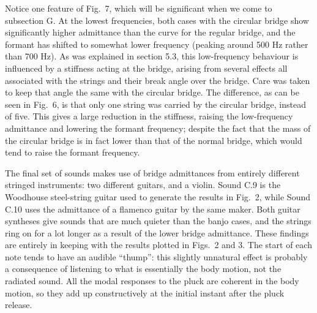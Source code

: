 
  Notice one feature of Fig.\ 7, which will be significant when we come to 
  subsection G. At the lowest frequencies, both cases with the circular bridge 
  show significantly higher admittance than the curve for the regular bridge, 
  and the formant has shifted to somewhat lower frequency (peaking around 500 
  Hz rather than 700 Hz). As was explained in section 5.3, this low-frequency 
  behaviour is influenced by a stiffness acting at the bridge, arising from 
  several effects all associated with the strings and their break angle over 
  the bridge. Care was taken to keep that angle the same with the circular 
  bridge. The difference, as can be seen in Fig.\ 6, is that only one string 
  was carried by the circular bridge, instead of five. This gives a large 
  reduction in the stiffness, raising the low-frequency admittance and lowering 
  the formant frequency; despite the fact that the mass of the circular bridge 
  is in fact lower than that of the normal bridge, which would tend to raise 
  the formant frequency. 

  The final set of sounds makes use of bridge admittances from entirely 
  different stringed instruments: two different guitars, and a violin. Sound 
  C.9 is the Woodhouse steel-string guitar used to generate the results in 
  Fig.\ 2, while Sound C.10 uses the admittance of a flamenco guitar by the 
  same maker. Both guitar syntheses give sounds that are much quieter than the 
  banjo cases, and the strings ring on for a lot longer as a result of the 
  lower bridge admittance. These findings are entirely in keeping with the 
  results plotted in Figs.\ 2 and 3. The start of each note tends to have an 
  audible ``thump'': this slightly unnatural effect is probably a consequence 
  of listening to what is essentially the body motion, not the radiated sound. 
  All the modal responses to the pluck are coherent in the body motion, so they 
  add up constructively at the initial instant after the pluck release. 



